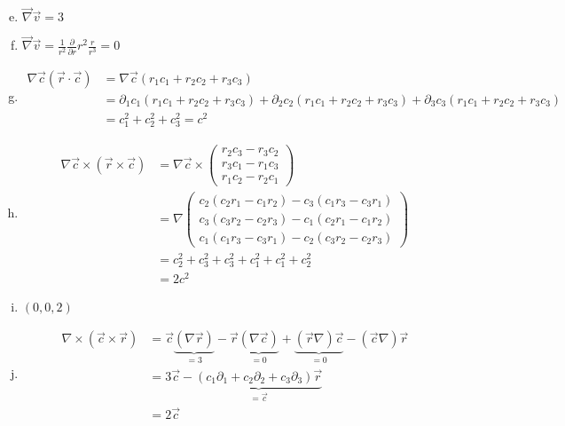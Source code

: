 \documentclass[a4paper,german,12pt,smallheadings]{scrartcl}
\begin{document}
\begin{enumerate}[a)]
  \setcounter{enumi}{4}
  \item $\vec{\nabla} \vec{v} = 3$
  \item $\vec{\nabla} \vec{v} = \frac{1}{r^2} \frac{\partial}{\partial r} r^2 \frac{r}{r^3} = 0$
  \item
    \begin{align}
      \nabla \vec{c}(\vec{r} \cdot \vec{c})
      &= \nabla \vec{c}(r_1c_1 + r_2c_2 + r_3c_3) \\
      & = \partial_1 c_1 (r_1c_1 + r_2c_2 + r_3c_3) +
      \partial_2 c_2 (r_1c_1 + r_2c_2 + r_3c_3) +
      \partial_3 c_3 (r_1c_1 + r_2c_2 + r_3c_3) \\
      &= c_1^2 + c_2^2 + c_3^2 = c^2
    \end{align}
  \item
    \begin{align}
      \nabla \vec{c} \times (\vec{r} \times \vec{c})
      &= \nabla \vec{c} \times \begin{pmatrix}
        r_2c_3 - r_3c_2 \\
        r_3c_1 - r_1c_3 \\
        r_1c_2 - r_2c_1
      \end{pmatrix} \\
      &= \nabla \begin{pmatrix}
        c_2(c_2r_1 - c_1r_2) - c_3(c_1r_3 - c_3r_1) \\
        c_3(c_3r_2 - c_2r_3) - c_1(c_2r_1 - c_1r_2) \\
        c_1(c_1r_3 - c_3r_1) - c_2(c_3r_2 - c_2r_3)
      \end{pmatrix} \\
      &= c_2^2 + c_3^2 + c_3^2 + c_1^2 + c_1^2 + c_2^2 \\
      &= 2c^2
    \end{align}

  \item $(0,0,2)$
  \item
    \begin{align}
    \nabla \times (\vec{c} \times \vec{r})
    &= \vec{c} \underbrace{(\nabla \vec{r})}_{=3}
      - \vec{r} \underbrace{(\nabla \vec{c})}_{=0}
      + \underbrace{(\vec{r} \nabla) \vec{c}}_{=0}
      - (\vec{c} \nabla) \vec{r} \\
    &= 3\vec{c} - \underbrace{(c_1\partial_1 + c_2\partial_2 + c_3\partial_3) \vec{r}}_{= \vec{c}} \\
    &= 2\vec{c}
    \end{align}
\end{enumerate}
\end{document}
